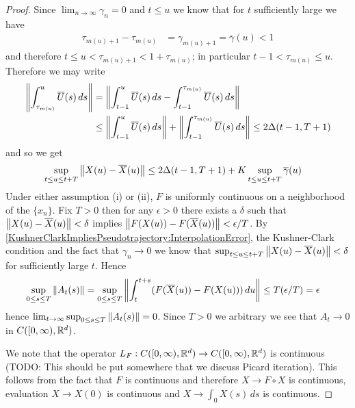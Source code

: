 \begin{proof}
Since $\lim_{n \to \infty} \gamma_n = 0$ and $t \leq u$ we know that for $t$ sufficiently large we have 
\begin{align*}
\tau_{m(u)+1} - \tau_{m(u)} &= \gamma_{m(u)+1} = \overline{\gamma}(u) < 1
\end{align*}
and therefore $t \leq u < \tau_{m(u)+1} < 1 + \tau_{m(u)}$; in particular $t-1 < \tau_{m(u)} \leq u$.  Therefore we may write
\begin{align*}
\left \lVert \int_{\tau_{m(u)}}^u \overline{U}(s) \, ds \right \rVert &= \left \lVert \int_{t-1}^u \overline{U}(s) \, ds - \int_{t-1}^{\tau_{m(u)}} \overline{U}(s) \, ds \right \rVert \\
&\leq \left \lVert \int_{t-1}^u \overline{U}(s) \, ds \right \rVert + \left \lVert \int_{t-1}^{\tau_{m(u)}} \overline{U}(s) \, ds \right \rVert \leq 2\Delta(t-1, T+1)
\end{align*}
and so we get
\begin{align}\label{KushnerClarkImpliesPseudotrajectory:InterpolationError}
\sup_{t \leq u \leq t+T} \left \lVert X(u) - \overline{X}(u) \right \rVert &\leq 2\Delta(t-1, T+1) + K \sup_{t \leq u \leq t+T}\overline{\gamma}(u) 
\end{align}
Under either assumption (i) or (ii), $F$ is uniformly continuous on a neighborhood of the $\lbrace x_n \rbrace$.  Fix $T > 0$ then for any
$\epsilon > 0$ there exists a $\delta$ such that $\left \lVert X(u) - \overline{X}(u) \right \rVert < \delta$ implies 
$\left \lVert F(X(u)) - F(\overline{X}(u)) \right \rVert < \epsilon/T$.  By \eqref{KushnerClarkImpliesPseudotrajectory:InterpolationError}, the Kushner-Clark condition 
and the fact that $\gamma_n \to 0$ we know that $\sup_{t \leq u \leq t+T} \left \lVert X(u) - \overline{X}(u) \right \rVert < \delta$ for sufficiently large $t$.  Hence
\begin{align*}
\sup_{0 \leq s \leq T} \left \lVert A_t(s) \right \rVert &= \sup_{0 \leq s \leq T} \left \lVert \int_t^{t+s} (F(\overline{X}(u)) - F(X(u))) \, du \right \rVert \leq T (\epsilon/T) = \epsilon
\end{align*}
hence $\lim_{t \to \infty} \sup_{0 \leq s \leq T} \left \lVert A_t(s) \right \rVert =0$.  Since $T>0$ we arbitrary we see that $A_t \to 0$ in $C([0,\infty), \mathbb{R}^d)$.

We note that the operator $L_F : C([0,\infty), \mathbb{R}^d) \to C([0,\infty), \mathbb{R}^d)$ is continuous (TODO: This should be put somewhere that we discuss
Picard iteration).  This follows from the fact that $F$ is continuous and therefore $X \to F \circ X$ is continuous, evaluation $X \to X(0)$ is continuous and
$X \to \int_0 X(s) \, ds$ is continuous.


\end{proof}
